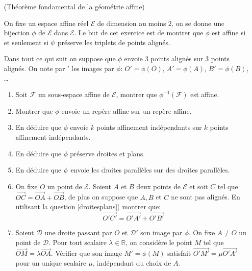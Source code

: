 \documentclass[a4paper,12pt,reqno]{amsart}
\begin{document}
\begin{exo} (Théorème fondamental de la géométrie affine)

  On fixe un espace affine réel $\mathcal{E}$ de dimension au moins $2$, on se donne une bijection $\phi$ de $\mathcal{E}$ dans $\mathcal{E}$. Le but de cet exercice est de montrer que $\phi$ est affine si et seulement si $\text{\ensuremath{\phi}}$ préserve les triplets de points alignés.

  \begin{convention}
    Dans tout ce qui suit on suppose que $\phi$ envoie $3$ points alignés sur $3$ points alignés. On note par ${}'$ les images par $\phi$: $O'=\phi(O)$, $A'=\phi(A)$, $B'=\phi(B)$, \ldots
  \end{convention}

  \begin{enumerate}
    \item Soit $\mathcal{F}$ un sous-espace affine de $\mathcal{E}$, montrer que $\phi^{-1}(\mathcal{F})$ est affine.

    \item Montrer que $\phi$ envoie un repère affine sur un repère affine.

    \item En déduire que $\phi$ envoie $k$ points affinement indépendants sur $k$ points affinement indépendants.

    \item En déduire que $\phi$ préserve droites et plans.

    \item \label{droitesplans} En déduire que $\text{\ensuremath{\phi}}$ envoie les droites parallèles sur des droites parallèles.

    \item On fixe $O$ un point de $\mathcal{E}$. Soient $A$ et $B$ deux points de $\mathcal{E}$ et soit $C$ tel que $\overrightarrow{OC}=\overrightarrow{OA}+\overrightarrow{OB}$, de plus on suppose que $A,B$ et $C$ ne sont pas alignés. En utilisant la question \ref{droitesplans}) montrer que:\vspace{-3mm}
      \[
        \overrightarrow{O'C'}=\overrightarrow{O'A'}+\overrightarrow{O'B'}
      \]

    \item Soient $\mathcal{D}$ une droite passant par $O$ et $\mathcal{D}'$ son image par $\phi$. On fixe $A\neq O$ un point de $\mathcal{D}$. Pour tout scalaire $\lambda\in\mathbb{R}$, on considère le point $M$ tel que $ \overrightarrow{OM}=\lambda\overrightarrow{OA}$.\newline
    Vérifier que son image $M'=\phi(M)$ satisfait $\overrightarrow{O'M'}=\mu\overrightarrow{O'A'}$ pour un unique scalaire $\mu$, indépendant du choix de $A$.


\end{enumerate}
\end{exo}
\end{document}
